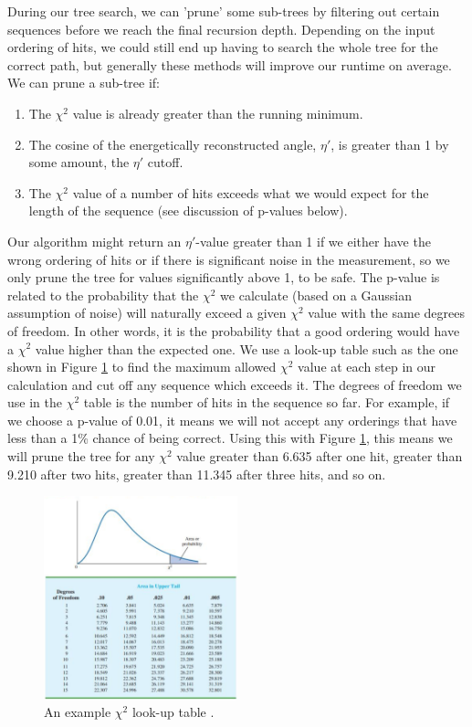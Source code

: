 During our tree search, we can 'prune' some sub-trees by filtering out certain sequences before we reach the final recursion depth. Depending on the input ordering of hits, we could still end up having to search the whole tree for the correct path, but generally these methods will improve our runtime on average. We can prune a sub-tree if:
\begin{enumerate}
    \item The $\chi^2$ value is already greater than the running minimum.
    \item The cosine of the energetically reconstructed angle, $\eta'$, is greater than 1 by some amount, the $\eta'$ cutoff.
    \item The $\chi^2$ value of a number of hits exceeds what we would expect for the length of the sequence (see discussion of p-values below).
\end{enumerate}
Our algorithm might return an $\eta'$-value greater than 1 if we either have the wrong ordering of hits or if there is significant noise in the measurement, so we only prune the tree for values significantly above 1, to be safe. The p-value is related to the probability that the $\chi^2$ we calculate (based on a Gaussian assumption of noise) will naturally exceed a given $\chi^2$ value with the same degrees of freedom. In other words, it is the probability that a good ordering would have a $\chi^2$ value higher than the expected one. We use a look-up table such as the one shown in Figure \ref{fig:p-val} to find the maximum allowed $\chi^2$ value at each step in our calculation and cut off any sequence which exceeds it. The degrees of freedom we use in the $\chi^2$ table is the number of hits in the sequence so far. For example, if we choose a p-value of 0.01, it means we will not accept any orderings that have less than a 1\% chance of being correct. Using this with Figure \ref{fig:p-val}, this means we will prune the tree for any $\chi^2$ value greater than 6.635 after one hit, greater than 9.210 after two hits, greater than 11.345 after three hits, and so on.

\begin{figure}
    \centering
    \includegraphics[width=0.5\textwidth]{chi2table.png}
    \caption{An example $\chi^2$ look-up table \cite{chitable}.}
    \label{fig:p-val}
\end{figure}

